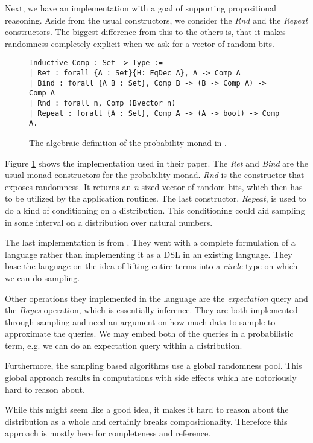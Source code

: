 Next, we have an implementation with a goal of supporting propositional reasoning.
Aside from the usual constructors, we consider the \emph{Rnd} and the \emph{Repeat}
constructors. The biggest difference from this to the others is, that
it makes randomness completely explicit when we ask for a vector of random bits.

\begin{figure}[H]
\begin{verbatim}
Inductive Comp : Set -> Type :=
| Ret : forall {A : Set}{H: EqDec A}, A -> Comp A
| Bind : forall {A B : Set}, Comp B -> (B -> Comp A) -> Comp A
| Rnd : forall n, Comp (Bvector n)
| Repeat : forall {A : Set}, Comp A -> (A -> bool) -> Comp A.
\end{verbatim}
\caption{The algebraic definition of the probability monad in \cite{Petcher:2015}.}
\label{code:petcher-monad}
\end{figure}

Figure \ref{code:petcher-monad} shows the implementation used in their paper.
The \emph{Ret} and \emph{Bind} are the usual monad constructors for the probability
monad.
\emph{Rnd} is the constructor
that exposes randomness. It returns an \emph{n}-sized vector of random bits, which then
has to be utilized by the application routines. The last constructor, \emph{Repeat}, 
is used to do a kind of conditioning on a distribution. This conditioning could aid
sampling in some interval on a distribution over natural numbers.

The last implementation is from \cite{Park:2008}. They went with a complete formulation
of a language rather than implementing it as a DSL in an existing language.
They base the language on the idea of lifting entire terms into a \emph{circle}-type
on which we can do sampling.

Other operations they implemented in the language are the \emph{expectation} query
and the \emph{Bayes} operation, which is essentially inference. They are both
implemented through sampling and need an argument on how much data to
sample to approximate the queries.
We may embed both of the queries in a probabilistic term, e.g. we can do an
expectation query within a distribution.

Furthermore, the sampling based algorithms use a global randomness pool.
This global approach results in computations with side effects which
are notoriously hard to reason about.

While this might seem like a good idea, it makes it hard to reason about the
distribution as a whole and certainly breaks compositionality. Therefore
this approach is mostly here for completeness and reference.

